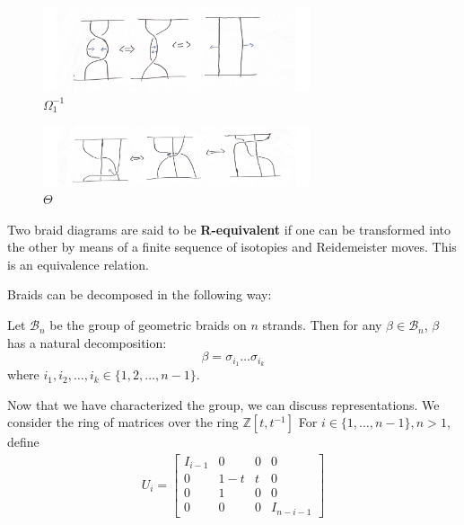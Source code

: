 \documentclass[compress,aspectratio=169,10pt,usenames,dvipsnames]{beamer}
\newcommand{\Z}{\mathbb{Z}}
\begin{document}
\begin{frame}
\vfill
\begin{figure}[H]
	\centering
	\includegraphics[width=0.7\textwidth]{reidmove2.png}
	\caption{$\Omega_1^{-1}$}
\end{figure}

\vfill
\begin{figure}[H]
	\centering
	\includegraphics[width=0.7\textwidth]{reidmove3.png}
	\caption{$\Theta$}
\end{figure}
\end{frame}
%
%
\begin{frame}
\vfill
\begin{definition}
	Two braid diagrams are said to be \textbf{R-equivalent} if one can be transformed into the other by means of a finite sequence of isotopies and Reidemeister moves. This is an equivalence relation.
\end{definition}
\vfill
Braids can be decomposed in the following way:
\begin{theorem}
	Let $\mathcal{B}_n$ be the group of geometric braids on $n$ strands. Then for any $\beta\in\mathcal{B}_n$, $\beta$ has a natural decomposition:
$$\beta = \sigma_{i_1}\hdots\sigma_{i_k}$$ 
where $i_1,i_2,\hdots,i_k\in\{1,2,\hdots,n-1\}$.
\end{theorem}
\vfill
\end{frame}

\begin{frame}
\vfill
Now that we have characterized the group, we can discuss representations. We consider the ring of matrices over the ring $\Z[t,t^{-1}]$
\vfill
For $i\in\{1,\hdots,n-1\},n>1$, define
\begin{equation}
\begin{aligned}
U_i = \begin{bmatrix}
			I_{i-1}& 0 & 0 & 0 \\
			0 & 1-t & t & 0\\
			0 & 1 & 0 & 0\\
			0 & 0 & 0 & I_{n-i-1}
		\end{bmatrix}
\end{aligned}
\end{equation}
\vfill
\end{frame}
\end{document}

